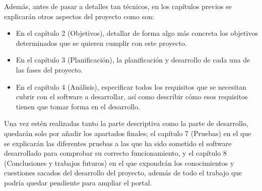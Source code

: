 \bigskip
Además, antes de pasar a detalles tan técnicos, en los capítulos previos se explicarán otros aspectos del proyecto como son:

\begin{itemize}
  \item En el capítulo 2 (Objetivos), detallar de forma algo más concreta los objetivos determinados que se quieren cumplir con este proyecto.
  \item En el capítulo 3 (Planificación), la planificación y desarrollo de cada una de las fases del proyecto.
  \item En el capítulo 4 (Análisis), especificar todos los requisitos que se necesitan cubrir con el software a desarrollar, así como describir cómo esos requisitos tienen que tomar forma en el desarrollo.
\end{itemize}

\bigskip
Una vez estén realizadas tanto la parte descriptiva como la parte de desarrollo, quedarán solo por añadir los apartados finales; el capítulo 7 (Pruebas) en el que se explicarán las diferentes pruebas a las que ha sido sometido el software desarrollado para comprobar su correcto funcionamiento, y el capítulo 8 (Conclusiones y trabajos futuros) en el que expondrán los conocimientos y cuestiones sacados del desarrollo del proyecto, además de todo el trabajo que podría quedar pendiente para ampliar el portal.

